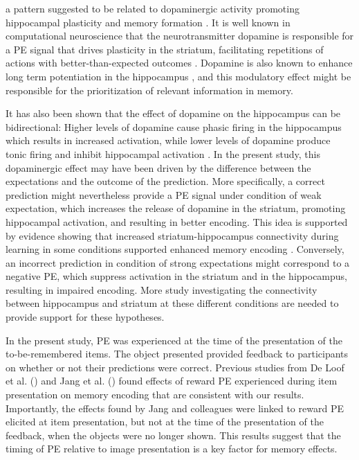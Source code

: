 \documentclass[a4paper,12pt]{article}
\begin{document}
a pattern suggested to be related to dopaminergic activity promoting hippocampal plasticity and memory formation \citep{Bethus2010,rosen2015midbrain}. It is well known in computational neuroscience that the neurotransmitter dopamine is responsible for a PE signal that drives plasticity in the striatum, facilitating repetitions of actions with better-than-expected outcomes \citep{Daw2013, Niv2008}. Dopamine is also known to enhance long term potentiation in the hippocampus \citep{lemon2006dopamine}, and this modulatory effect might be responsible for the prioritization of relevant information in memory. \par 
It has also been shown that the effect of dopamine on the hippocampus can be bidirectional: Higher levels of dopamine cause phasic firing in the hippocampus which results in increased activation, while lower levels of dopamine produce tonic firing and inhibit hippocampal activation \citep{rosen2015midbrain}. In the present study, this dopaminergic effect may have been driven by the difference between the expectations and the outcome of the prediction. More specifically, a correct prediction might nevertheless provide a PE signal under condition of weak expectation, which increases the release of dopamine in the striatum, promoting hippocampal activation, and resulting in better encoding. This idea is supported by evidence showing that increased striatum-hippocampus connectivity during learning in some conditions supported enhanced memory encoding \citep{Davidow2016}. Conversely, an incorrect prediction in condition of strong expectations might correspond to a negative PE, which suppress activation in the striatum and in the hippocampus, resulting in impaired encoding. More study investigating the connectivity between hippocampus and striatum at these different conditions are needed to provide support for these hypotheses. 
\par 
In the present study, PE was experienced at the time of the presentation of the to-be-remembered items. The object presented provided feedback to participants on whether or not their predictions were correct. Previous studies from De Loof et al. (\citeyear{de2018signed}) and Jang et al. (\citeyear{Jang2019}) found effects of reward PE experienced during item presentation on memory encoding that are consistent with our results. Importantly, the effects found by Jang and colleagues were linked to reward PE elicited at item presentation, but not at the time of the presentation of the feedback, when the objects were no longer shown. This results suggest that the timing of PE relative to image presentation is a key factor for memory effects. 
\end{document}
